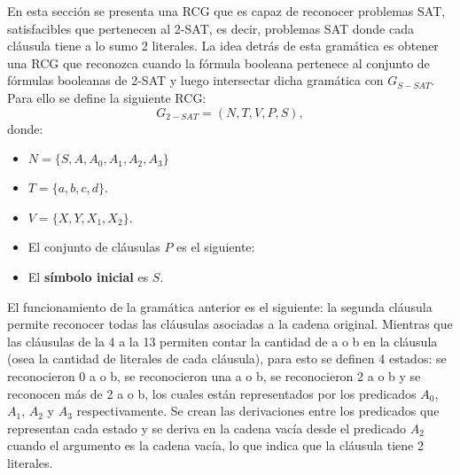 En esta sección se presenta una RCG que es capaz de reconocer problemas SAT, satisfacibles que pertenecen
al 2-SAT, es decir, problemas SAT donde cada cláusula tiene a lo sumo 2 literales. La idea detrás de esta
gramática es obtener una RCG que reconozca cuando la fórmula booleana pertenece al conjunto
de fórmulas booleanas de 2-SAT y luego intersectar dicha gramática con $G_{S-SAT}$.  Para ello se define la siguiente RCG:
\[
    G_{2-SAT} = (N, T, V, P, S),
\]
donde:

\begin{itemize}
    \item $N=\{S,A,A_0,A_1,A_2,A_3\}$
    \item $T=\{a,b,c,d\}$.
    \item $V=\{X,Y,X_1,X_2\}$.
    \item El conjunto de cláusulas $P$ es el siguiente:
          \begin{enumerate}
          \end{enumerate}
    \item El \textbf{símbolo inicial} es $S$.
\end{itemize}

El funcionamiento de la gramática anterior es el siguiente: la segunda cláusula permite reconocer todas las
cláusulas asociadas a la cadena original. Mientras que las cláusulas de la 4 a la 13 permiten contar
la cantidad de a o b en la cláusula (osea la cantidad de literales de cada cláusula), para esto se definen
4 estados: se reconocieron 0 a o b, se reconocieron una a o b, se reconocieron 2 a o b y se reconocen
más de 2 a o b, los cuales están representados por los predicados $A_0$, $A_1$, $A_2$ y $A_3$ respectivamente.
Se crean las derivaciones entre los predicados que representan cada estado y se deriva en la cadena vacía
desde el predicado $A_2$ cuando el argumento es la cadena vacía, lo que indica que la cláusula tiene 2 literales.


